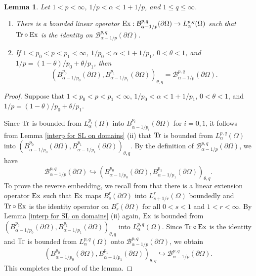 \documentclass[reqno,centertags,11pt]{amsart}
\newtheorem{lem}[thm]{Lemma}
\theoremstyle{definition}
\numberwithin{thm}{section}
\numberwithin{equation}{section}
\begin{document}
\begin{lem}\label{trace results-1}  Let $1<p<\infty$, $1/p < \alpha <1 +1/p$, and $1 \le q \le \infty$.
\begin{enumerate}[{\upshape(i)}]
\item  There is a bounded linear operator ${\rm Ex} : \mathcal B^{p,q}_{\alpha-1/p}(\partial \Omega ) \rightarrow L_\alpha^{p,q} (\Omega )$ such that ${\rm Tr} \circ {\rm Ex}  $ is  the identity on $\mathcal B^{p,q}_{\alpha-1/p}(\partial \Omega )$.
\item If  $1< p_0 < p < p_1 <\infty$, $1/p_0< \alpha <1+1/p_1$, $0< \theta <1$, and $1/p=(1-\theta)/p_0+\theta/p_1$,
then
\[
\left(  B^{p_0}_{\alpha-1/p_0}(\partial \Omega ),  B^{p_1}_{\alpha-1/p_1}(\partial \Omega ) \right)_{\theta,q}= \mathcal B^{p,q}_{\alpha-1/p}(\partial \Omega ).
\]
\end{enumerate}
\end{lem}

\begin{proof}
Suppose   that  $1< p_0 < p < p_1 <\infty$, $1/p_0< \alpha <1+1/p_1$, $0< \theta <1$, and $1/p=(1-\theta)/p_0+\theta/p_1$.

Since    ${\rm Tr}$ is bounded from $L^{p_i}_{\alpha}(\Omega)$ into $ B^{p_i}_{\alpha-1/p_i}(\partial \Omega)$ for $i=0,1$,   it follows from Lemma \ref{interp for SL on domains} (ii) that  ${\rm Tr}$ is bounded from $L^{p,q}_{\alpha}(\Omega)$ into $\left(  B^{p_0}_{\alpha-1/p_0}(\partial \Omega ),  B^{p_1}_{\alpha-1/p_1}(\partial \Omega ) \right)_{\theta,q}$. By the definition of $\mathcal{B}^{p,q}_{\alpha-1/p}(\partial \Omega )$, we have
\[
 \mathcal B^{p,q}_{\alpha-1/p}(\partial \Omega ) \hookrightarrow\left(  B^{p_0}_{\alpha-1/p_0}(\partial \Omega ),  B^{p_1}_{\alpha-1/p_1}(\partial \Omega ) \right)_{\theta,q}.
\]
To prove the reverse embedding, we recall from \cite[Theorem 3.1]{JK}  that
there is a   linear extension operator ${\rm Ex}$ such that ${\rm Ex}$ maps $B^r_s(\partial \Omega)$ into $L^r_{s+1/r}(\Omega)$ boundedly   and ${\rm  Tr}\circ {\rm Ex}$ is the identity operator on $B^r_s(\partial \Omega)$  for all $0<s<1$  and $1<r<\infty$.   By  Lemma \ref{interp for SL on domains} (ii) again, ${\rm Ex}$ is bounded from $\left(  B^{p_0}_{\alpha-1/p_0}(\partial \Omega ),  B^{p_1}_{\alpha-1/p_1}(\partial \Omega ) \right)_{\theta,q}$ into $L^{p,q}_{\alpha}(\Omega)$. Since ${\rm  Tr}\circ {\rm Ex}$ is the identity and ${\rm  Tr} $ is bounded from $L^{p,q}_{\alpha}(\Omega)$ onto $\mathcal{B}^{p,q}_{\alpha-1/p}(\partial \Omega )$, we obtain
\[
\left(  B^{p_0}_{\alpha-1/p_0}(\partial \Omega ),  B^{p_1}_{\alpha-1/p_1}(\partial \Omega ) \right)_{\theta,q} \hookrightarrow \mathcal B^{p,q}_{\alpha-1/p}(\partial \Omega ).
\]
This completes the proof of the lemma.
\end{proof}
\end{document}
